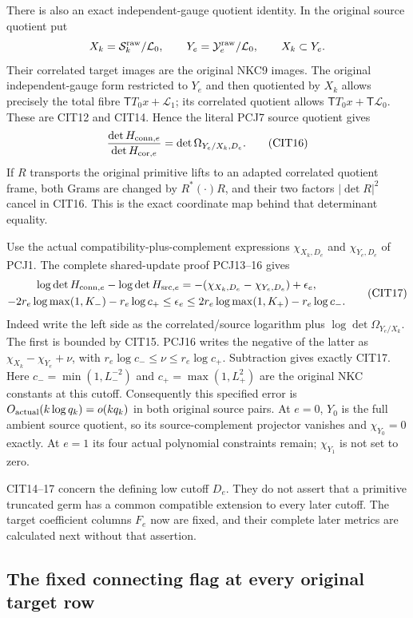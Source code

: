 \documentclass[10pt]{article}
\begin{document}
There is also an exact independent-gauge quotient identity.
In the original source quotient put
\[
 X_k=\mathcal S_k^{\rm raw}/\mathcal L_0,\qquad
 Y_e=\mathcal Y_e^{\rm raw}/\mathcal L_0,\qquad X_k\subset Y_e .
\]
Their correlated target images are the original NKC9 images.
The original independent-gauge form restricted to $Y_e$ and
then quotiented by $X_k$ allows precisely the total fibre
$\mathsf T T_0x+\mathcal L_1$; its correlated quotient allows
$\mathsf T T_0x+\mathsf T\mathcal L_0$. These are CIT12 and
CIT14. Hence the literal PCJ7 source quotient gives
\[
 \frac{\det H_{{\rm conn},e}}{\det H_{{\rm cor},e}}
                =\det\Omega_{Y_e/X_k,D_e}.
 \tag{CIT16}
\]
If $R$ transports the original primitive lifts to an adapted
correlated quotient frame, both Grams are changed by $R^*(\cdot)R$,
and their two factors $|\det R|^2$ cancel in CIT16. This is
the exact coordinate map behind that determinant equality.

Use the actual compatibility-plus-complement expressions
$\chi_{X_k,D_e}$ and $\chi_{Y_e,D_e}$ of PCJ1.
The complete shared-update proof PCJ13--16 gives
\[
 \begin{gathered}
 \log\det H_{{\rm conn},e}-\log\det H_{{\rm src},e}
   =-(\chi_{X_k,D_e}-\chi_{Y_e,D_e})+\epsilon_e,\\
 -2r_e\log\max(1,K_-)-r_e\log c_+
      \le\epsilon_e
      \le2r_e\log\max(1,K_+)-r_e\log c_- .
 \end{gathered}\tag{CIT17}
\]
Indeed write the left side as the correlated/source logarithm
plus $\log\det\Omega_{Y_e/X_k}$. The first is bounded by
CIT15. PCJ16 writes the negative of the latter as
$\chi_{X_k}-\chi_{Y_e}+\nu$, with
$r_e\log c_-\le\nu\le r_e\log c_+$. Subtraction gives exactly
CIT17. Here $c_-=\min(1,L_-^{-2})$ and
$c_+=\max(1,L_+^2)$ are the original NKC constants at this
cutoff. Consequently this specified error is
$O_{\rm actual}(k\log q_k)=o(kq_k)$ in both original source pairs.
At $e=0$, $Y_0$ is the full ambient source quotient, so its
source-complement projector vanishes and $\chi_{Y_0}=0$
exactly. At $e=1$ its four actual polynomial constraints
remain; $\chi_{Y_1}$ is not set to zero.

CIT14--17 concern the defining low cutoff $D_e$. They do not
assert that a primitive truncated germ has a common compatible
extension to every later cutoff. The target coefficient columns
$F_e$ now are fixed, and their complete later metrics are
calculated next without that assertion.

\subsection{The fixed connecting flag at every original target row}
\end{document}
